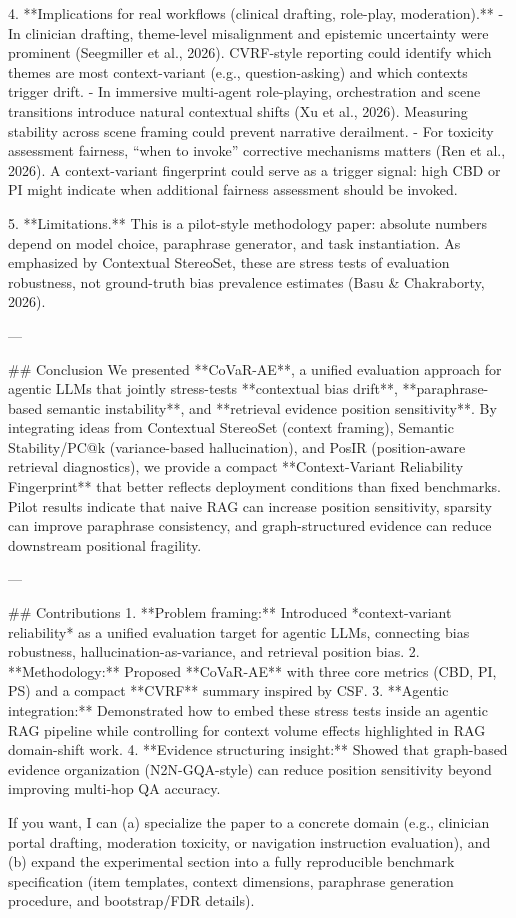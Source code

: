 4. **Implications for real workflows (clinical drafting, role-play, moderation).**
   - In clinician drafting, theme-level misalignment and epistemic uncertainty were prominent (Seegmiller et al., 2026). CVRF-style reporting could identify which themes are most context-variant (e.g., question-asking) and which contexts trigger drift.
   - In immersive multi-agent role-playing, orchestration and scene transitions introduce natural contextual shifts (Xu et al., 2026). Measuring stability across scene framing could prevent narrative derailment.
   - For toxicity assessment fairness, “when to invoke” corrective mechanisms matters (Ren et al., 2026). A context-variant fingerprint could serve as a trigger signal: high CBD or PI might indicate when additional fairness assessment should be invoked.

5. **Limitations.** This is a pilot-style methodology paper: absolute numbers depend on model choice, paraphrase generator, and task instantiation. As emphasized by Contextual StereoSet, these are stress tests of evaluation robustness, not ground-truth bias prevalence estimates (Basu & Chakraborty, 2026).

---

## Conclusion
We presented **CoVaR-AE**, a unified evaluation approach for agentic LLMs that jointly stress-tests **contextual bias drift**, **paraphrase-based semantic instability**, and **retrieval evidence position sensitivity**. By integrating ideas from Contextual StereoSet (context framing), Semantic Stability/PC@k (variance-based hallucination), and PosIR (position-aware retrieval diagnostics), we provide a compact **Context-Variant Reliability Fingerprint** that better reflects deployment conditions than fixed benchmarks. Pilot results indicate that naive RAG can increase position sensitivity, sparsity can improve paraphrase consistency, and graph-structured evidence can reduce downstream positional fragility.

---

## Contributions
1. **Problem framing:** Introduced *context-variant reliability* as a unified evaluation target for agentic LLMs, connecting bias robustness, hallucination-as-variance, and retrieval position bias.
2. **Methodology:** Proposed **CoVaR-AE** with three core metrics (CBD, PI, PS) and a compact **CVRF** summary inspired by CSF.
3. **Agentic integration:** Demonstrated how to embed these stress tests inside an agentic RAG pipeline while controlling for context volume effects highlighted in RAG domain-shift work.
4. **Evidence structuring insight:** Showed that graph-based evidence organization (N2N-GQA-style) can reduce position sensitivity beyond improving multi-hop QA accuracy.

If you want, I can (a) specialize the paper to a concrete domain (e.g., clinician portal drafting, moderation toxicity, or navigation instruction evaluation), and (b) expand the experimental section into a fully reproducible benchmark specification (item templates, context dimensions, paraphrase generation procedure, and bootstrap/FDR details).